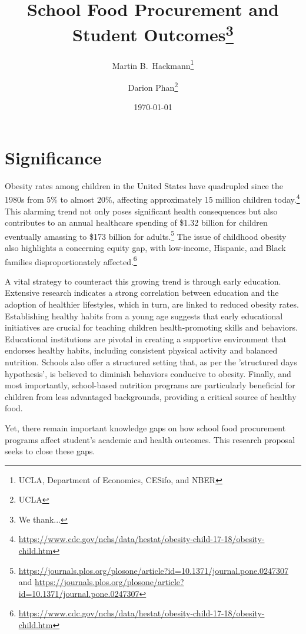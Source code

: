 \documentclass[12pt]{article}
\begin{document}
\title{School Food Procurement and Student Outcomes\thanks{We thank...}}
\author{Martin B.\ Hackmann\thanks{UCLA, Department of Economics, CESifo, and NBER} \and Darion Phan\thanks{UCLA} }
\date{\today}

\maketitle
\section{Significance} Obesity rates among children in the United States have quadrupled since the 1980s from 5\% to almost 20\%, affecting approximately 15 million children today.\footnote{\url{https://www.cdc.gov/nchs/data/hestat/obesity-child-17-18/obesity-child.htm}} This alarming trend not only poses significant health consequences but also contributes to an annual healthcare spending of \$1.32 billion for children eventually amassing to \$173 billion for adults.\footnote{\url{https://journals.plos.org/plosone/article?id=10.1371/journal.pone.0247307} and \url{https://journals.plos.org/plosone/article?id=10.1371/journal.pone.0247307}} The issue of childhood obesity also highlights a concerning equity gap, with low-income, Hispanic, and Black families disproportionately affected.\footnote{\url{https://www.cdc.gov/nchs/data/hestat/obesity-child-17-18/obesity-child.htm}}

A vital strategy to counteract this growing trend is through early education. Extensive research indicates a strong correlation between education and the adoption of healthier lifestyles, which in turn, are linked to reduced obesity rates. Establishing healthy habits from a young age suggests that early educational initiatives are crucial for teaching children health-promoting skills and behaviors. Educational institutions are pivotal in creating a supportive environment that endorses healthy habits, including consistent physical activity and balanced nutrition. Schools also offer a structured setting that, as per the 'structured days hypothesis', is believed to diminish behaviors conducive to obesity. Finally, and most importantly, school-based nutrition programs are particularly beneficial for children from less advantaged backgrounds, providing a critical source of healthy food.

Yet, there remain important knowledge gaps on how school food procurement programs affect student's academic and health outcomes. This research proposal seeks to close these gaps. 
\end{document}
